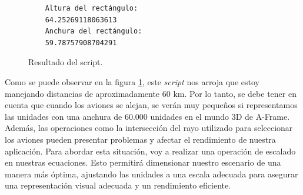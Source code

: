 \documentclass[a4paper, 11pt]{book}
\begin{document}
\begin{figure}[h]
	\centering
	\begin{verbatim}
	Altura del rectángulo:
	64.25269118063613
	Anchura del rectángulo:
	59.78757908704291
	\end{verbatim}
	\caption{Resultado del script.
	\label{codigo:resultadoDimensiones}
	}
\end{figure}
Como se puede observar en la figura \ref{codigo:resultadoDimensiones}, este \emph{script} nos arroja que estoy manejando distancias de aproximadamente 60 km. 
Por lo tanto, se debe tener en cuenta que cuando los aviones se alejan, se verán muy pequeños si representamos las unidades con una anchura de 60.000 unidades en el mundo 3D de A-Frame. Además, las operaciones como la intersección del rayo utilizado para seleccionar los aviones pueden presentar problemas y afectar el rendimiento de nuestra aplicación.
Para abordar esta situación, voy a realizar una operación de escalado en nuestras ecuaciones. Esto permitirá dimensionar nuestro escenario de una manera más óptima, ajustando las unidades a una escala adecuada para asegurar una representación visual adecuada y un rendimiento eficiente.
\end{document}
